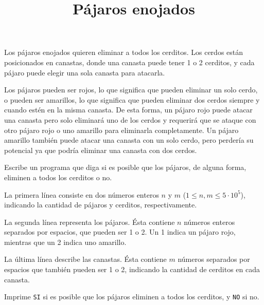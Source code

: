 \documentclass{oci}
\title{Pájaros enojados}
\begin{document}
\begin{problemDescription}
Los pájaros enojados quieren eliminar a todos los cerditos. Los cerdos están posicionados en canastas, donde una
canasta puede tener 1 o 2 cerditos, y cada pájaro puede elegir una sola canasta para atacarla.

Los pájaros pueden ser rojos, lo que significa que pueden eliminar un solo cerdo, o pueden ser amarillos, lo que significa
que pueden eliminar dos cerdos siempre y cuando estén en la misma canasta. De esta forma, un pájaro rojo puede atacar
una canasta pero solo eliminará uno de los cerdos y requerirá que se ataque con otro pájaro rojo o uno amarillo para eliminarla
completamente. Un pájaro amarillo también puede atacar una canasta con un solo cerdo, pero perdería su potencial ya que
podría eliminar una canasta con dos cerdos.

Escribe un programa que diga si es posible que los pájaros, de alguna forma, eliminen a todos los cerditos o no.
\end{problemDescription}

\begin{inputDescription}
	La primera línea consiste en dos números enteros $n$ y $m$ ($1 \leq n, m \leq 5 \cdot 10^5$), indicando la cantidad de pájaros y cerditos,
	respectivamente.

	La segunda línea representa los pájaros. Ésta contiene $n$ números enteros separados por espacios, que pueden ser
	1 o 2. Un 1 indica un pájaro rojo, mientras que un 2 indica uno amarillo.

	La última línea describe las canastas. Ésta contiene $m$ números separados por espacios que también pueden ser 1 o 2,
	indicando la cantidad de cerditos en cada canasta.
\end{inputDescription}

\begin{outputDescription}
	Imprime \texttt{SI} si es posible que los pájaros eliminen a todos los cerditos, y \texttt{NO} si no.
\end{outputDescription}

\begin{sampleDescription}
\end{sampleDescription}
\end{document}
